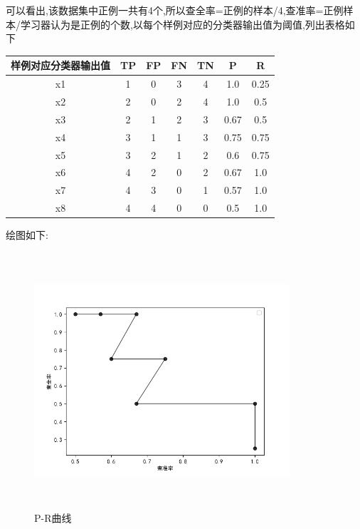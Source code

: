 \documentclass[answers]{exam}  %
\begin{document}
\begin{questions}
\begin{solution}
        可以看出,该数据集中正例一共有4个,所以查全率=正例的样本/4,查准率=正例样本/学习器认为是正例的个数,以每个样例对应的分类器输出值为阈值,列出表格如下
        \begin{center}
            \begin{tabular}{|c|c|c|c|c|c|c|}
                \hline
                样例对应分类器输出值 & TP & FP & FN & TN & P    & R    \\
                \hline
                x1                   & 1  & 0  & 3  & 4  & 1.0  & 0.25 \\
                \hline
                x2                   & 2  & 0  & 2  & 4  & 1.0  & 0.5  \\
                \hline
                x3                   & 2  & 1  & 2  & 3  & 0.67 & 0.5  \\
                \hline
                x4                   & 3  & 1  & 1  & 3  & 0.75 & 0.75 \\
                \hline
                x5                   & 3  & 2  & 1  & 2  & 0.6  & 0.75 \\
                \hline
                x6                   & 4  & 2  & 0  & 2  & 0.67 & 1.0  \\
                \hline
                x7                   & 4  & 3  & 0  & 1  & 0.57 & 1.0  \\
                \hline
                x8                   & 4  & 4  & 0  & 0  & 0.5  & 1.0  \\
                \hline
            \end{tabular}
        \end{center}
        绘图如下:

        \begin{figure}[H]
            \centering
            \includegraphics[width=9.5cm,height=9.5cm]{Figure_1.png}
            \caption{P-R曲线}
        \end{figure}



\end{solution}
\end{questions}
\end{document}
